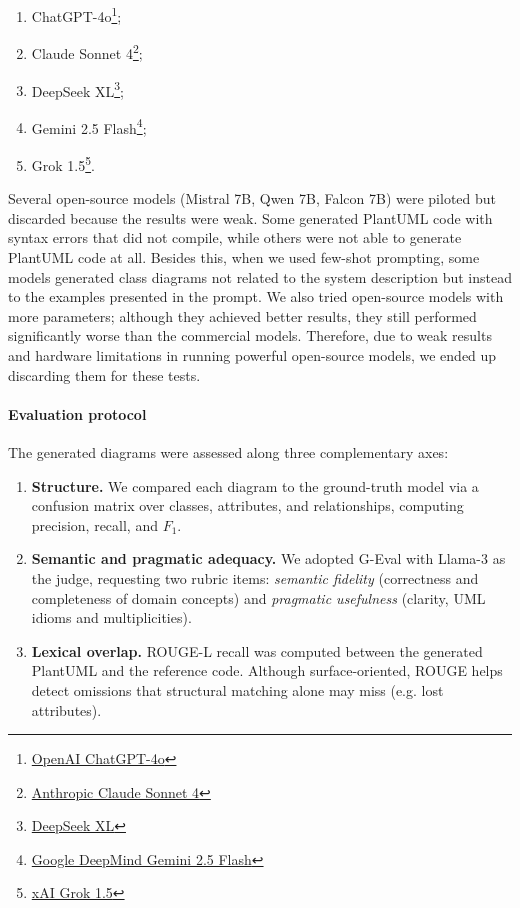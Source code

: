 \begin{enumerate}
    \item ChatGPT-4o\footnote{\href{https://openai.com/chatgpt}{OpenAI ChatGPT-4o}};
    \item Claude Sonnet 4\footnote{\href{https://www.anthropic.com/news/claude-3-5-sonnet}{Anthropic Claude Sonnet 4}};
    \item DeepSeek XL\footnote{\href{https://deepseek.com/}{DeepSeek XL}};
    \item Gemini 2.5 Flash\footnote{\href{https://deepmind.google/technologies/gemini/}{Google DeepMind Gemini 2.5 Flash}};
    \item Grok 1.5\footnote{\href{https://x.ai/}{xAI Grok 1.5}}.
\end{enumerate}


Several open-source models (Mistral 7B, Qwen 7B, Falcon 7B) were piloted but discarded because the results were weak. 
Some generated PlantUML code with syntax errors that did not compile, while others were not able to generate PlantUML code at all. 
Besides this, when we used few-shot prompting, some models generated class diagrams not related to the system description but instead to the examples presented in the prompt. 
We also tried open-source models with more parameters; although they achieved better results, they still performed significantly worse than the commercial models. 
Therefore, due to weak results and hardware limitations in running powerful open-source models, we ended up discarding them for these tests.
\paragraph{Evaluation protocol}

The generated diagrams were assessed along three complementary axes:

\begin{enumerate}
    \item \textbf{Structure.}
        We compared each diagram to the ground-truth model via a confusion matrix over classes, attributes, and relationships, computing precision, recall, and $F_1$.
    \item \textbf{Semantic and pragmatic adequacy.}
        We adopted G-Eval \cite{liu2023gevalnlgevaluationusing} with Llama-3 as the judge, requesting two rubric items: \emph{semantic fidelity} (correctness and completeness of domain concepts) and \emph{pragmatic usefulness} (clarity, UML idioms and multiplicities).
    \item \textbf{Lexical overlap.}
        ROUGE-L recall \cite{lin-2004-rouge} was computed between the generated PlantUML and the reference code. Although surface-oriented, ROUGE helps detect omissions that structural matching alone may miss (e.g. lost attributes).
\end{enumerate}
